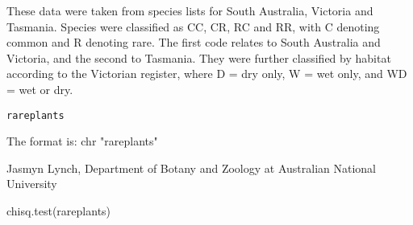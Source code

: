 \begin{Description}\relax
These data were taken from species lists for South Australia, Victoria and 
Tasmania.  Species were classified as CC, CR, RC and RR, with C denoting
common and R denoting rare.  The first code relates to South Australia 
and Victoria, and the second to Tasmania.  They were further classified
by habitat according to the Victorian register, where D = dry only, 
W = wet only, and WD = wet or dry.
\end{Description}
\begin{Usage}
\begin{verbatim}rareplants\end{verbatim}
\end{Usage}
\begin{Format}\relax
The format is:
chr "rareplants"
\end{Format}
\begin{Source}\relax
Jasmyn Lynch, Department of Botany and Zoology at Australian National 
University
\end{Source}
\begin{Examples}
\begin{ExampleCode}
chisq.test(rareplants)
\end{ExampleCode}
\end{Examples}

